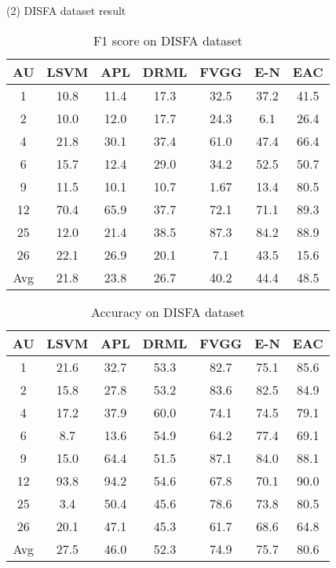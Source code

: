 \documentclass[a4paper, 10pt, conference]{ieeeconf}      %
\begin{document}
(2) DISFA dataset result

\begin{table}
\caption{F1 score on DISFA dataset}
\label{tab6}
\begin{center}
\begin{tabular}{|c|c|c|c|c|c|c|}
\hline
AU&LSVM&APL\cite{p22}&DRML\cite{p22}&FVGG&E-N&EAC\\
\hline
1&10.8&11.4&17.3&32.5&37.2&41.5\\
2&10.0&12.0&17.7&24.3&6.1&26.4\\
4&21.8&30.1&37.4&61.0&47.4&66.4\\
6&15.7&12.4&29.0&34.2&52.5&50.7\\
9&11.5&10.1&10.7&1.67&13.4&80.5\\
12&70.4&65.9&37.7&72.1&71.1&89.3\\
25&12.0&21.4&38.5&87.3&84.2&88.9\\
26&22.1&26.9&20.1&7.1&43.5&15.6\\
Avg&21.8&23.8&26.7&40.2&44.4&48.5\\
\hline
\end{tabular}
\end{center}
\end{table}

\begin{table}
\caption{Accuracy on DISFA dataset}
\label{tab7}
\begin{center}
\begin{tabular}{|c|c|c|c|c|c|c|}
\hline
AU&LSVM&APL\cite{p22}&DRML\cite{p22}&FVGG&E-N&EAC\\
\hline
1&21.6&32.7&53.3&82.7&75.1&85.6\\
2&15.8&27.8&53.2&83.6&82.5&84.9\\
4&17.2&37.9&60.0&74.1&74.5&79.1\\
6&8.7&13.6&54.9&64.2&77.4&69.1\\
9&15.0&64.4&51.5&87.1&84.0&88.1\\
12&93.8&94.2&54.6&67.8&70.1&90.0\\
25&3.4&50.4&45.6&78.6&73.8&80.5\\
26&20.1&47.1&45.3&61.7&68.6&64.8\\
Avg&27.5&46.0&52.3&74.9&75.7&80.6\\

\hline
\end{tabular}
\end{center}
\end{table}
\end{document}

